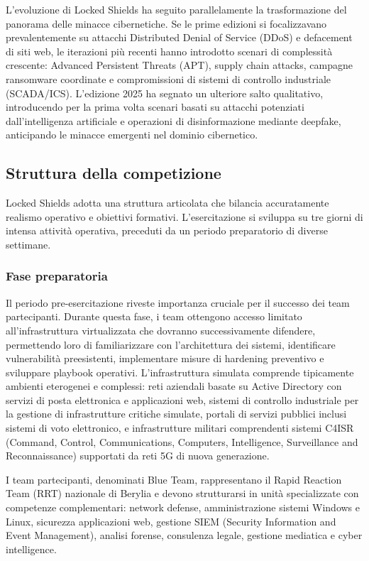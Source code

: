 L'evoluzione di Locked Shields ha seguito parallelamente la trasformazione del panorama delle minacce cibernetiche. Se le prime edizioni si focalizzavano prevalentemente su attacchi Distributed Denial of Service (DDoS) e defacement di siti web, le iterazioni più recenti hanno introdotto scenari di complessità crescente: Advanced Persistent Threats (APT), supply chain attacks, campagne ransomware coordinate e compromissioni di sistemi di controllo industriale (SCADA/ICS). L'edizione 2025 ha segnato un ulteriore salto qualitativo, introducendo per la prima volta scenari basati su attacchi potenziati dall'intelligenza artificiale e operazioni di disinformazione mediante deepfake, anticipando le minacce emergenti nel dominio cibernetico.

\subsection{Struttura della competizione}

Locked Shields adotta una struttura articolata che bilancia accuratamente realismo operativo e obiettivi formativi. L'esercitazione si sviluppa su tre giorni di intensa attività operativa, preceduti da un periodo preparatorio di diverse settimane.

\subsubsection{Fase preparatoria}
Il periodo pre-esercitazione riveste importanza cruciale per il successo dei team partecipanti. Durante questa fase, i team ottengono accesso limitato all'infrastruttura virtualizzata che dovranno successivamente difendere, permettendo loro di familiarizzare con l'architettura dei sistemi, identificare vulnerabilità preesistenti, implementare misure di hardening preventivo e sviluppare playbook operativi. L'infrastruttura simulata comprende tipicamente ambienti eterogenei e complessi: reti aziendali basate su Active Directory con servizi di posta elettronica e applicazioni web, sistemi di controllo industriale per la gestione di infrastrutture critiche simulate, portali di servizi pubblici inclusi sistemi di voto elettronico, e infrastrutture militari comprendenti sistemi C4ISR (Command, Control, Communications, Computers, Intelligence, Surveillance and Reconnaissance) supportati da reti 5G di nuova generazione.

I team partecipanti, denominati Blue Team, rappresentano il Rapid Reaction Team (RRT) nazionale di Berylia e devono strutturarsi in unità specializzate con competenze complementari: network defense, amministrazione sistemi Windows e Linux, sicurezza applicazioni web, gestione SIEM (Security Information and Event Management), analisi forense, consulenza legale, gestione mediatica e cyber intelligence.

